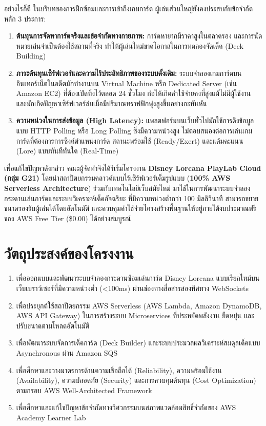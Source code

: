 \documentclass[12pt,a4paper]{report}
\begin{document}
อย่างไรก็ดี ในบริบทของการฝึกซ้อมและการเข้าถึงเกมการ์ด ผู้เล่นส่วนใหญ่ยังคงประสบกับข้อจำกัดหลัก 3 ประการ:
\begin{enumerate}
    \item \textbf{ต้นทุนการจัดหาการ์ดจริงและข้อจำกัดทางกายภาพ:} การ์ดหายากมีราคาสูงในตลาดรอง และการนัดหมายเล่นจำเป็นต้องใช้สถานที่จริง ทำให้ผู้เล่นใหม่ขาดโอกาสในการทดลองจัดเด็ค (Deck Building)
    \item \textbf{ภาระต้นทุนเซิร์ฟเวอร์และความไร้ประสิทธิภาพของระบบดั้งเดิม:} ระบบจำลองเกมการ์ดบนอินเทอร์เน็ตในอดีตมักทำงานบน Virtual Machine หรือ Dedicated Server (เช่น Amazon EC2) ที่ต้องเปิดทิ้งไว้ตลอด 24 ชั่วโมง ก่อให้เกิดค่าใช้จ่ายคงที่สูงแม้ไม่มีผู้ใช้งาน และมักเกิดปัญหาเซิร์ฟเวอร์ล่มเมื่อมีปริมาณทราฟฟิกพุ่งสูงขึ้นอย่างกะทันหัน
    \item \textbf{ความหน่วงในการส่งข้อมูล (High Latency):} แพลตฟอร์มบนเว็บทั่วไปมักใช้การดึงข้อมูลแบบ HTTP Polling หรือ Long Polling ซึ่งมีความหน่วงสูง ไม่ตอบสนองต่อการเล่นเกมการ์ดที่ต้องการการซิงค์ตำแหน่งการ์ด สถานะพร้อมใช้ (Ready/Exert) และแต้มคะแนน (Lore) แบบทันทีทันใด (Real-Time)
\end{enumerate}

เพื่อแก้ไขปัญหาดังกล่าว คณะผู้จัดทำจึงได้ริเริ่มโครงงาน \textbf{Disney Lorcana PlayLab Cloud (กลุ่ม G21)} โดยนำสถาปัตยกรรมคลาวด์แบบไร้เซิร์ฟเวอร์เต็มรูปแบบ (\textbf{100\% AWS Serverless Architecture}) ร่วมกับเทคโนโลยีเว็บสมัยใหม่ มาใช้ในการพัฒนาระบบจำลองกระดานเล่นการ์ดและระบบวิเคราะห์เด็คอัจฉริยะ ที่มีความหน่วงต่ำกว่า 100 มิลลิวินาที สามารถขยายขนาดรองรับผู้เล่นได้โดยอัตโนมัติ และควบคุมค่าใช้จ่ายโครงสร้างพื้นฐานให้อยู่ภายใต้งบประมาณฟรีของ AWS Free Tier (\$0.00) ได้อย่างสมบูรณ์

\section{วัตถุประสงค์ของโครงงาน}
\begin{enumerate}
    \item เพื่อออกแบบและพัฒนาระบบจำลองกระดานซ้อมเล่นการ์ด Disney Lorcana แบบเรียลไทม์บนเว็บเบราว์เซอร์ที่มีความหน่วงต่ำ (<100ms) ผ่านช่องทางสื่อสารสองทิศทาง WebSockets
    \item เพื่อประยุกต์ใช้สถาปัตยกรรม AWS Serverless (AWS Lambda, Amazon DynamoDB, AWS API Gateway) ในการสร้างระบบ Microservices ที่ประหยัดพลังงาน ยืดหยุ่น และปรับขนาดตามโหลดอัตโนมัติ
    \item เพื่อพัฒนาระบบจัดการเด็คการ์ด (Deck Builder) และระบบประมวลผลวิเคราะห์สมดุลเด็คแบบ Asynchronous ผ่าน Amazon SQS
    \item เพื่อศึกษาและวางมาตรการด้านความเชื่อถือได้ (Reliability), ความพร้อมใช้งาน (Availability), ความปลอดภัย (Security) และการควบคุมต้นทุน (Cost Optimization) ตามกรอบ AWS Well-Architected Framework
    \item เพื่อศึกษาและแก้ไขปัญหาข้อจำกัดทางวิศวกรรมบนสภาพแวดล้อมสิทธิ์จำกัดของ AWS Academy Learner Lab
\end{enumerate}
\end{document}
